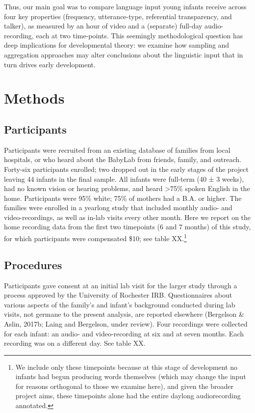 \documentclass[floatsintext,man]{apa6}
\theoremstyle{definition}
\theoremstyle{definition}
\theoremstyle{definition}
\theoremstyle{remark}
\begin{document}
Thus, our main goal was to compare language input young infants receive
across four key properties (frequency, utterance-type, referential
transparency, and talker), as measured by an hour of video and a
(separate) full-day audio-recording, each at two time-points. This
seemingly methodological question has deep implications for
developmental theory: we examine how sampling and aggregation approaches
may alter conclusions about the linguistic input that in turn drives
early development.

\section{Methods}\label{methods}

\subsection{Participants}\label{participants}

Participants were recruited from an existing database of families from
local hospitals, or who heard about the BabyLab from friends, family,
and outreach. Forty-six participants enrolled; two dropped out in the
early stages of the project leaving 44 infants in the final sample. All
infants were full-term (40 ± 3 weeks), had no known vision or hearing
problems, and heard \textgreater{}75\% spoken English in the home.
Participants were 95\% white; 75\% of mothers had a B.A. or higher. The
families were enrolled in a yearlong study that included monthly audio-
and video-recordings, as well as in-lab visits every other month. Here
we report on the home recording data from the first two timepoints (6
and 7 months) of this study, for which participants were compensated
\$10; see table
XX.\footnote{We include only these timepoints because at this stage of development no infants had begun producing words themselves (which may change the input for reasons orthogonal to those we examine here), and given the broader project aims, these timepoints alone had the entire daylong audiorecording annotated.}

\subsection{Procedures}\label{procedures}

Participants gave consent at an initial lab visit for the larger study
through a process approved by the University of Rochester IRB.
Questionnaires about various aspects of the family's and infant's
background conducted during lab visits, not germane to the present
analysis, are reported elsewhere (Bergelson \& Aslin, 2017b; Laing and
Bergelson, under review). Four recordings were collected for each
infant: an audio- and video-recording at six and at seven months. Each
recording was on a different day. See table XX.
\end{document}
